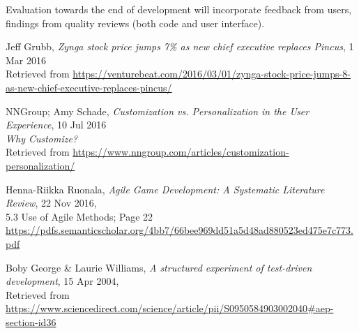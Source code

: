 \documentclass[11pt]{article}
\begin{document}
{Evaluation towards the end of development will incorporate feedback from users, findings from quality reviews (both code and user interface). 


\renewcommand\refname{Bibliography}
\begin{thebibliography}{9}

\begin{flushleft}
	Jeff Grubb,
	\textit{Zynga stock price jumps 7\% as new chief executive replaces Pincus}, 
	1 Mar 2016 \\
	Retrieved from \url{https://venturebeat.com/2016/03/01/zynga-stock-price-jumps-8-as-new-chief-executive-replaces-pincus/}
\end{flushleft}

\begin{flushleft}
	NNGroup; Amy Schade,
	\textit{Customization vs. Personalization in the User Experience}, 
	10 Jul 2016 \\
	\textit{Why Customize?}	\\
	Retrieved from \url{https://www.nngroup.com/articles/customization-personalization/}
\end{flushleft}


\begin{flushleft}
	Henna-Riikka Ruonala,
	\textit{Agile Game Development: A Systematic Literature Review}, 
	22 Nov 2016, \\
	5.3 Use of Agile Methods; Page 22 \\
	\url{https://pdfs.semanticscholar.org/4bb7/66bee969dd51a5d48ad880523ed475e7c773.pdf}
\end{flushleft}

\begin{flushleft}
	Boby George \& Laurie Williams, 
	\textit{A structured experiment of test-driven development}, 
	15 Apr 2004, \\
	Retrieved from \url{https://www.sciencedirect.com/science/article/pii/S0950584903002040#aep-section-id36}
\end{flushleft}
	
\end{thebibliography}

\newpage



}
\end{document}
